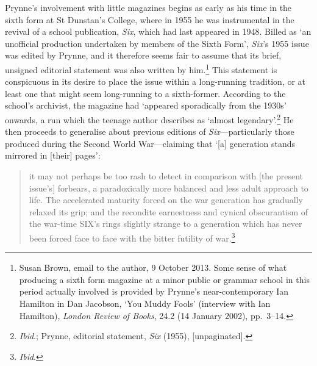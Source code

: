 \documentclass[]{article}
\begin{document}
Prynne's involvement with little magazines begins as early as his time
in the sixth form at St Dunstan's College, where in 1955 he was
instrumental in the revival of a school publication, \emph{Six}, which
had last appeared in 1948. Billed as `an unofficial production
undertaken by members of the Sixth Form', \emph{Six}'s 1955 issue was
edited by Prynne, and it therefore seems fair to assume that its brief,
unsigned editorial statement was also written by him.\footnote{Susan
  Brown, email to the author, 9 October 2013. Some sense of what
  producing a sixth form magazine at a minor public or grammar school in
  this period actually involved is provided by Prynne's
  near-contemporary Ian Hamilton in Dan Jacobson, `You Muddy Fools'
  (interview with Ian Hamilton), \emph{London Review of Books}, 24.2 (14
  January 2002), pp.~3--14.} This statement is conspicuous in its desire
to place the issue within a long-running tradition, or at least one that
might seem long-running to a sixth-former. According to the school's
archivist, the magazine had `appeared sporadically from the 1930s'
onwards, a run which the teenage author describes as `almost
legendary'.\footnote{\emph{Ibid}.; Prynne, editorial statement,
  \emph{Six} (1955), {[}unpaginated{]}.} He then proceeds to generalise
about previous editions of \emph{Six}---particularly those produced
during the Second World War---claiming that `{[}a{]} generation stands
mirrored in {[}their{]} pages':

\begin{quote}
it may not perhaps be too rash to detect in comparison with {[}the
present issue's{]} forbears, a paradoxically more balanced and less
adult approach to life. The accelerated maturity forced on the war
generation has gradually relaxed its grip; and the recondite earnestness
and cynical obscurantism of the war-time SIX's rings slightly strange to
a generation which has never been forced face to face with the bitter
futility of war.\footnote{\emph{Ibid}.}
\end{quote}
\end{document}
